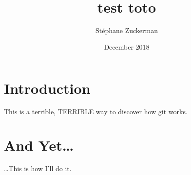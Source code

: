 \documentclass{article}
\title{test toto}
\author{St\'ephane Zuckerman}
\date{December 2018}
\begin{document}
\maketitle

\section{Introduction}
This is a terrible, TERRIBLE way to discover how git works.

\section{And Yet\ldots}
\ldots This is how I'll do it.
\end{document}
